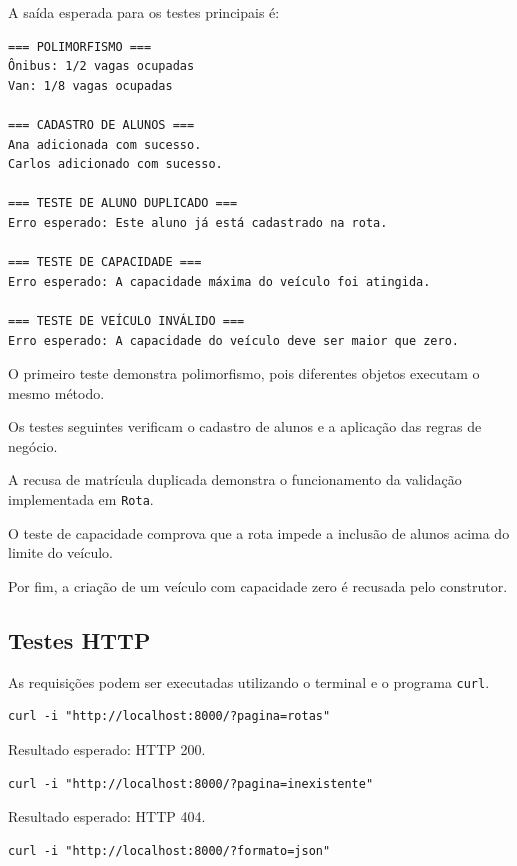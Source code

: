 \documentclass[12pt,a4paper]{article}
\begin{document}
A saída esperada para os testes principais é:

\begin{lstlisting}
=== POLIMORFISMO ===
Ônibus: 1/2 vagas ocupadas
Van: 1/8 vagas ocupadas

=== CADASTRO DE ALUNOS ===
Ana adicionada com sucesso.
Carlos adicionado com sucesso.

=== TESTE DE ALUNO DUPLICADO ===
Erro esperado: Este aluno já está cadastrado na rota.

=== TESTE DE CAPACIDADE ===
Erro esperado: A capacidade máxima do veículo foi atingida.

=== TESTE DE VEÍCULO INVÁLIDO ===
Erro esperado: A capacidade do veículo deve ser maior que zero.
\end{lstlisting}

O primeiro teste demonstra polimorfismo, pois diferentes objetos executam o mesmo método.

Os testes seguintes verificam o cadastro de alunos e a aplicação das regras de negócio.

A recusa de matrícula duplicada demonstra o funcionamento da validação implementada em \texttt{Rota}.

O teste de capacidade comprova que a rota impede a inclusão de alunos acima do limite do veículo.

Por fim, a criação de um veículo com capacidade zero é recusada pelo construtor.

\subsection{Testes HTTP}

As requisições podem ser executadas utilizando o terminal e o programa \texttt{curl}.

\begin{lstlisting}
curl -i "http://localhost:8000/?pagina=rotas"
\end{lstlisting}

Resultado esperado: HTTP 200.

\begin{lstlisting}
curl -i "http://localhost:8000/?pagina=inexistente"
\end{lstlisting}

Resultado esperado: HTTP 404.

\begin{lstlisting}
curl -i "http://localhost:8000/?formato=json"
\end{lstlisting}
\end{document}
